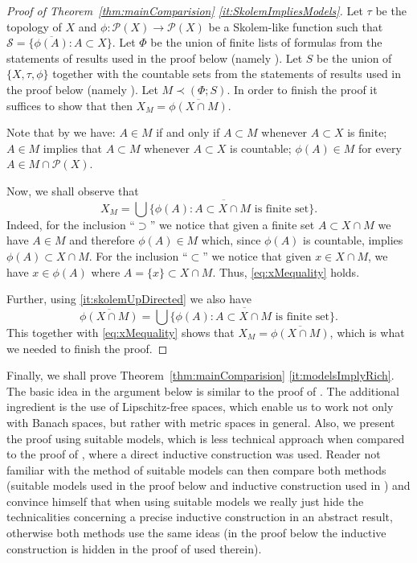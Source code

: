 \documentclass[11pt]{amsart}
\theoremstyle{definition}
\theoremstyle{remark}
\newcommand{\PP}{\mathcal P}
\newcommand{\SSS}{\mathcal S}
\begin{document}
\begin{proof}[Proof of Theorem~\ref{thm:mainComparision} \eqref{it:SkolemImpliesModels}]Let $\tau$ be the topology of $X$ and $\phi:\PP(X)\to\PP(X)$ be a Skolem-like function such that $\SSS = \{\overline{\phi(A)}\colon A\subset X\}$. Let $\Phi$ be the union of finite lists of formulas from the statements of results used in the proof below (namely \cite[Lemma 7]{CCS0}). Let $S$ be the union of $\{X,\tau,\phi\}$ together with the countable sets from the statements of results used in the proof below (namely \cite[Lemma 7]{CCS0}). Let $M \prec (\Phi; S)$. In order to finish the proof it suffices to show that then $X_M = \overline{\phi(X\cap M)}$.

Note that by \cite[Lemma 7]{CCS0} we have: $A\in M$ if and only if $A\subset M$ whenever $A\subset X$ is finite; $A\in M$ implies that $A\subset M$ whenever $A\subset X$ is countable; $\phi(A)\in M$ for every $A\in M\cap \PP(X)$.

Now, we shall observe that
\begin{equation}\label{eq:xMequality}
X_M = \overline{\bigcup\{\phi(A)\colon A\subset X\cap M\text{ is finite set}\}}.
\end{equation}
Indeed, for the inclusion ``$\supset$'' we notice that given a finite set $A\subset X\cap M$ we have $A\in M$ and therefore $\phi(A)\in M$ which, since $\phi(A)$ is countable, implies $\phi(A)\subset X\cap M$. For the inclusion ``$\subset$'' we notice that given $x\in X\cap M$, we have $x\in \phi(A)$ where $A = \{x\}\subset X\cap M$. Thus, \eqref{eq:xMequality} holds.

Further, using \ref{it:skolemUpDirected} we also have
\[
\overline{\phi(X\cap M)} = \overline{\bigcup\{\phi(A)\colon A\subset X\cap M\text{ is finite set}\}}.
\]
This together with \eqref{eq:xMequality} shows that $X_M = \overline{\phi(X\cap M)}$, which is what we needed to finish the proof.
\end{proof}

Finally, we shall prove Theorem~\ref{thm:mainComparision} \eqref{it:modelsImplyRich}. The basic idea in the argument below is similar to the proof of \cite[Theorem 21]{C18}. The additional ingredient is the use of Lipschitz-free spaces, which enable us to work not only with Banach spaces, but rather with metric spaces in general. Also, we present the proof using suitable models, which is less technical approach when compared to the proof of \cite[Theorem 21]{C18}, where a direct inductive construction was used. Reader not familiar with the method of suitable models can then compare both methods (suitable models used in the proof below and inductive construction used in \cite[Theorem 21]{C18}) and convince himself that when using suitable models we really just hide the technicalities concerning a precise inductive construction in an abstract result, otherwise both methods use the same ideas (in the proof below the inductive construction is hidden in the proof of \cite[Lemma 13]{CCS} used therein).
\end{document}
